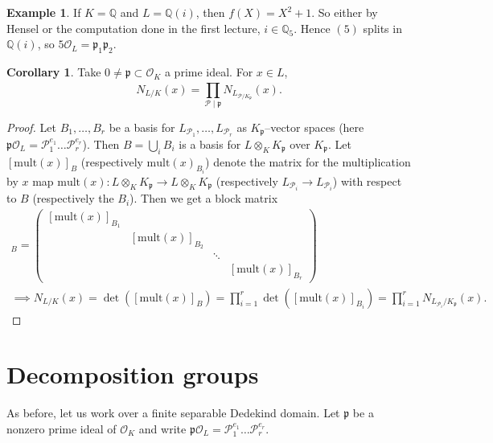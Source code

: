 \documentclass{article}
\theoremstyle{definition}
\newtheorem{cor}[theorem]{Corollary}
\newtheorem{example}{Example}[section]
\begin{document}
\begin{example}
    If $K=\mathbb{Q}$ and $L = \mathbb{Q}(i)$, then $f(X)=X^2+1$. So either by Hensel or the computation done in the first lecture, $i \in \mathbb{Q}_{5}$. Hence $(5)$ splits in $\mathbb{Q}(i)$, so $5\mathcal{O}_L = \mathfrak{p}_1 \mathfrak{p}_2$.
\end{example}


\begin{cor}
    Take $0 \neq \mathfrak{p} \subset \mathcal{O}_K$ a prime ideal. For $x \in L$, $$N_{L/K}(x) = \prod_{\mathcal{P} \mid  \mathfrak{p}}^{} N_{L_{\mathcal{P}/K_{\mathfrak{p}}}}(x).$$
\end{cor}
\begin{proof}
    Let $B_1,\ldots,B_r$ be a basis for $L_{\mathcal{P}_1},\ldots, L_{\mathcal{P}_r}$ as $K_{\mathfrak{p}}$--vector spaces (here $\mathfrak{p}\mathcal{O}_L = \mathcal{P}_1^{e_1}\ldots \mathcal{P}_r^{e_r}$). Then $B = \bigcup_{i} B_i$ is a basis for $L \otimes_K K_{\mathfrak{p}}$ over $K_{\mathfrak{p}}$. Let $[\text{mult}(x)]_{B}$ (respectively $\text{mult}(x)_{B_i}$) denote the matrix for the multiplication by $x$ map $\text{mult}(x) : L \otimes_K K_{\mathfrak{p}} \to L \otimes_K K_{\mathfrak{p}}$ (respectively $L_{\mathcal{P}_i} \to L_{\mathcal{P}_i}$) with respect to $B$ (respectively the $B_i$). Then we get a block matrix
    \begin{align*}
        [\text{mult}(x)]_B = \begin{pmatrix} [\text{mult}(x)]_{B_1} & & \\
        & [\text{mult}(x)]_{B_2} & \\ & &\ddots & \\ & & & [\text{mult}(x)]_{B_r} \end{pmatrix}
        \\
        \implies N_{L/K}(x) = \det([\text{mult}(x)]_B) = \prod_{i=1}^{r} \det([\text{mult}(x)]_{B_i}) = \prod_{i=1}^{r} N_{L_{\mathcal{P}_i}/K_{\mathfrak{p}}}(x).
    \end{align*}
\end{proof}

\section{Decomposition groups}
As before, let us work over a finite separable Dedekind domain. Let $\mathfrak{p}$ be a nonzero prime ideal of $\mathcal{O}_K$ and write $\mathfrak{p}\mathcal{O}_L = \mathcal{P}_1^{e_1}\ldots \mathcal{P}_r^{e_r}$.
\vspace{1mm}
 
\end{document}
